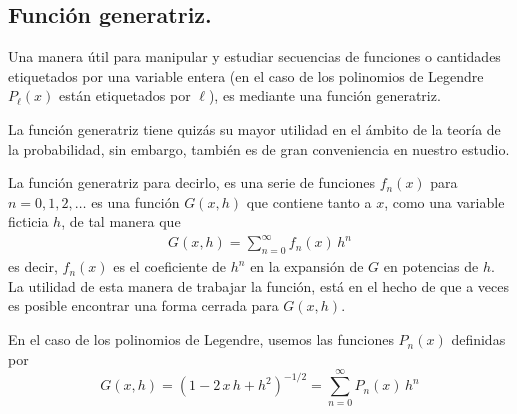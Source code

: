 \subsection{Función generatriz.}
Una manera útil para manipular y estudiar secuencias de funciones o cantidades etiquetados por una variable entera (en el caso de los polinomios de Legendre $P_{\ell} (x)$ están etiquetados por $\ell$), es mediante una función generatriz. 
\par
La función generatriz tiene quizás su mayor utilidad en el ámbito de la teoría de la probabilidad, sin embargo, también es de gran conveniencia en nuestro estudio.
\par
La función generatriz para decirlo, es una serie de funciones $f_{n} (x)$ para $n = 0, 1, 2,\ldots$ es una función $G (x, h)$ que contiene tanto a $x$, como una variable ficticia $h$, de tal manera que
\begin{align*}
G(x,h) = \sum_{n=0}^{\infty} f_{n} (x) \, h^{n}
\end{align*}
es decir, $f_{n}(x)$ es el coeficiente de $h^{n}$ en la expansión de $G$ en potencias de $h$. La utilidad de esta manera de trabajar la función, está en el hecho de que a veces es posible encontrar una forma cerrada para $G(x,h)$.
\par
En el caso de los polinomios de Legendre, usemos las funciones $P_{n}(x)$ definidas por
\begin{equation}
G(x,h) = (1 - 2 \, x \, h + h^{2})^{-1/2} =  \sum_{n=0}^{\infty} P_{n}(x) \, h^{n}
\label{eq:ecuacion_18_15}
\end{equation}
